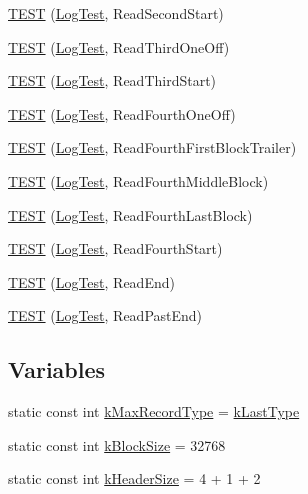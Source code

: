 \begin{DoxyCompactItemize}
\item 
\hyperlink{namespaceleveldb_1_1log_aa9e212a334431228c79a843316480db0}{T\-E\-S\-T} (\hyperlink{classleveldb_1_1log_1_1_log_test}{Log\-Test}, Read\-Second\-Start)
\item 
\hyperlink{namespaceleveldb_1_1log_af5f8505f08225382f290158f5175cca0}{T\-E\-S\-T} (\hyperlink{classleveldb_1_1log_1_1_log_test}{Log\-Test}, Read\-Third\-One\-Off)
\item 
\hyperlink{namespaceleveldb_1_1log_a87cfcd7bb0a248dc72d9856e1d00d519}{T\-E\-S\-T} (\hyperlink{classleveldb_1_1log_1_1_log_test}{Log\-Test}, Read\-Third\-Start)
\item 
\hyperlink{namespaceleveldb_1_1log_abbda151ff0e2439ac1dfa823a6089439}{T\-E\-S\-T} (\hyperlink{classleveldb_1_1log_1_1_log_test}{Log\-Test}, Read\-Fourth\-One\-Off)
\item 
\hyperlink{namespaceleveldb_1_1log_a85f6833939c09f181924774403bfbe4f}{T\-E\-S\-T} (\hyperlink{classleveldb_1_1log_1_1_log_test}{Log\-Test}, Read\-Fourth\-First\-Block\-Trailer)
\item 
\hyperlink{namespaceleveldb_1_1log_a6fb47c0abe5c036d95a4f9aeb1d62174}{T\-E\-S\-T} (\hyperlink{classleveldb_1_1log_1_1_log_test}{Log\-Test}, Read\-Fourth\-Middle\-Block)
\item 
\hyperlink{namespaceleveldb_1_1log_a9c80a844e21aec7c6fbde209e99c1ad8}{T\-E\-S\-T} (\hyperlink{classleveldb_1_1log_1_1_log_test}{Log\-Test}, Read\-Fourth\-Last\-Block)
\item 
\hyperlink{namespaceleveldb_1_1log_aa652940a4e7bff7fa21f0d1c941712d7}{T\-E\-S\-T} (\hyperlink{classleveldb_1_1log_1_1_log_test}{Log\-Test}, Read\-Fourth\-Start)
\item 
\hyperlink{namespaceleveldb_1_1log_a74e0fb6c39041d1ef2193114b0a2275b}{T\-E\-S\-T} (\hyperlink{classleveldb_1_1log_1_1_log_test}{Log\-Test}, Read\-End)
\item 
\hyperlink{namespaceleveldb_1_1log_ae1081d375c33d8b2f01d5593ecd5f4a7}{T\-E\-S\-T} (\hyperlink{classleveldb_1_1log_1_1_log_test}{Log\-Test}, Read\-Past\-End)
\end{DoxyCompactItemize}
\subsection*{Variables}
\begin{DoxyCompactItemize}
\item 
static const int \hyperlink{namespaceleveldb_1_1log_a45cb8306b6156236656172086c1394df}{k\-Max\-Record\-Type} = \hyperlink{namespaceleveldb_1_1log_a01bdc1b51beb634f14f8fbb70fbd8d2aa29f913fb4d719f97a9618bca93775dfc}{k\-Last\-Type}
\item 
static const int \hyperlink{namespaceleveldb_1_1log_a2daa4274b5fc09292a7d856072f379b2}{k\-Block\-Size} = 32768
\item 
static const int \hyperlink{namespaceleveldb_1_1log_a3771f9a7e5d0e9057d33fbfd371f7e83}{k\-Header\-Size} = 4 + 1 + 2
\end{DoxyCompactItemize}


